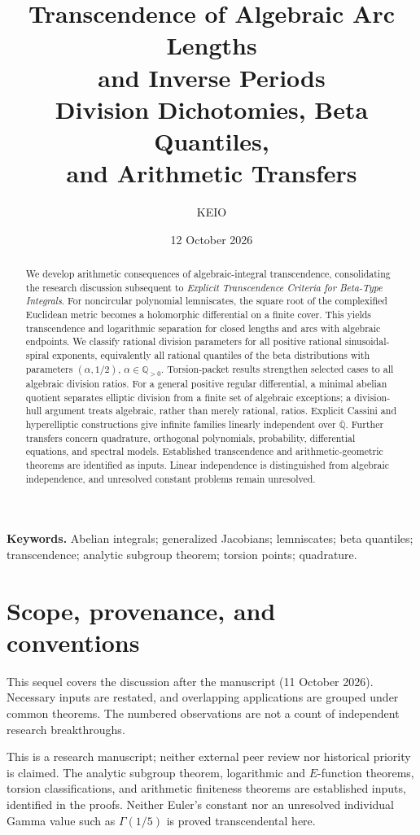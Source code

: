 \documentclass[11pt,a4paper]{article}
\title{\bfseries Transcendence of Algebraic Arc Lengths\\and Inverse Periods\\[6pt]
\large Division Dichotomies, Beta Quantiles,\\and Arithmetic Transfers}
\author{KEIO}
\date{12 October 2026}
\theoremstyle{definition}
\theoremstyle{remark}
\numberwithin{equation}{section}
\newcommand{\Qbar}{\overline{\mathbb Q}}
\begin{document}
\maketitle
\begin{abstract}
We develop arithmetic consequences of algebraic-integral transcendence,
consolidating the research discussion subsequent to
\emph{Explicit Transcendence Criteria for Beta-Type Integrals}.
For noncircular polynomial lemniscates, the square root of the complexified
Euclidean metric becomes a holomorphic differential on a finite cover.
This yields transcendence and logarithmic separation for closed lengths
and arcs with algebraic endpoints. We classify rational division parameters
for all positive rational sinusoidal-spiral exponents, equivalently all
rational quantiles of the beta distributions with parameters
$(\alpha,1/2)$, $\alpha\in\mathbb Q_{>0}$. Torsion-packet results strengthen
selected cases to all algebraic division ratios. For a general positive
regular differential, a minimal abelian quotient separates elliptic
division from a finite set of algebraic exceptions; a division-hull
argument treats algebraic, rather than merely rational, ratios.
Explicit Cassini and hyperelliptic constructions give infinite families
linearly independent over $\Qbar$. Further transfers concern quadrature,
orthogonal polynomials, probability, differential equations, and spectral
models. Established transcendence and arithmetic-geometric theorems are
identified as inputs. Linear independence is distinguished from algebraic
independence, and unresolved constant problems remain unresolved.
\end{abstract}
\noindent\textbf{Keywords.} Abelian integrals; generalized Jacobians;
lemniscates; beta quantiles; transcendence; analytic subgroup theorem;
torsion points; quadrature.

\section*{Scope, provenance, and conventions}
This sequel covers the discussion after the manuscript
 (11 October 2026).
Necessary inputs are restated, and overlapping applications are grouped
under common theorems. The numbered observations are not a count of
independent research breakthroughs.

This is a research manuscript; neither external peer review nor
historical priority is claimed. The analytic subgroup theorem,
logarithmic and $E$-function theorems, torsion classifications, and
arithmetic finiteness theorems are established inputs, identified in the
proofs. Neither Euler's constant nor an unresolved individual Gamma
value such as $\Gamma(1/5)$ is proved transcendental here.
\end{document}
